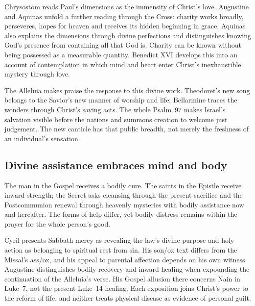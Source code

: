 Chrysostom reads Paul's dimensions as the immensity of Christ's love. Augustine and Aquinas unfold a further reading through the Cross: charity works broadly, perseveres, hopes for heaven and receives its hidden beginning in grace. Aquinas also explains the dimensions through divine perfections and distinguishes knowing God's presence from containing all that God is. Charity can be known without being possessed as a measurable quantity. Benedict XVI develops this into an account of contemplation in which mind and heart enter Christ's inexhaustible mystery through love. 

The Alleluia makes praise the response to this divine work. Theodoret's new song belongs to the Savior's new manner of worship and life; Bellarmine traces the wonders through Christ's saving acts. The whole Psalm~97 makes Israel's salvation visible before the nations and summons creation to welcome just judgement. The new canticle has that public breadth, not merely the freshness of an individual's sensation. 

\subsection*{Divine assistance embraces mind and body}
The man in the Gospel receives a bodily cure. The saints in the Epistle receive inward strength; the Secret asks cleansing through the present sacrifice and the Postcommunion renewal through heavenly mysteries with bodily assistance now and hereafter. The forms of help differ, yet bodily distress remains within the prayer for the whole person's good.

Cyril presents Sabbath mercy as revealing the law's divine purpose and holy action as belonging to spiritual rest from sin. His son/ox text differs from the Missal's ass/ox, and his appeal to parental affection depends on his own witness. Augustine distinguishes bodily recovery and inward healing when expounding the continuation of the Alleluia's verse. His Gospel allusion there concerns Nain in Luke~7, not the present Luke~14 healing. Each exposition joins Christ's power to the reform of life, and neither treats physical disease as evidence of personal guilt. 

